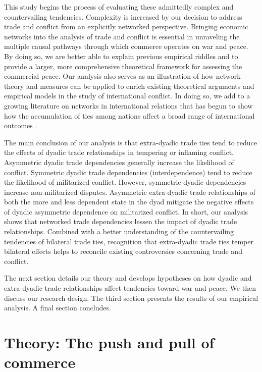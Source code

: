 \documentclass[12pt]{article}
\theoremstyle{hypothesis}
\begin{document}
This study begins the process of evaluating these admittedly complex and countervailing tendencies. Complexity is increased by our decision to address trade and conflict from an explicitly networked perspective. Bringing economic networks into the analysis of trade and conflict is essential in unraveling the multiple causal pathways through which commerce operates on war and peace. By doing so, we are better able to explain previous empirical riddles and to provide a larger, more comprehensive theoretical framework for assessing the commercial peace. Our analysis also serves as an illustration of how network theory and measures can be applied to enrich existing theoretical arguments and empirical models in the study of international conflict. In doing so, we add to a growing literature on networks in international relations that has begun to show how the accumulation of ties among nations affect a broad range of international outcomes \citep{Maoz:2011,Dorussen:2008,Ward:2016,Hafner:2008,Hegre:2010,Lupu:2016,Wilson:2016,Chyzh:2016}.

The main conclusion of our analysis is that extra-dyadic trade ties tend to reduce the effects of dyadic trade relationships in tempering or inflaming conflict. Asymmetric dyadic trade dependencies generally increase the likelihood of conflict. Symmetric dyadic trade dependencies (interdependence) tend to reduce the likelihood of militarized conflict.  However, symmetric dyadic dependencies increase non-militarized disputes. Asymmetric extra-dyadic trade relationships of both the more and less dependent state in the dyad mitigate the negative effects of dyadic asymmetric dependence on militarized conflict. In short, our analysis shows that networked trade dependencies lessen the impact of dyadic trade relationships.  Combined with a better understanding of the countervailing tendencies of bilateral trade ties, recognition that extra-dyadic trade ties temper bilateral effects helps to reconcile existing controversies concerning trade and conflict.

The next section details our theory and develops hypotheses on how dyadic and extra-dyadic trade relationships affect tendencies toward war and peace. We then discuss our research design. The third section presents the results of our empirical analysis. A final section concludes.

\section*{Theory: The push and pull of commerce}
\end{document}
